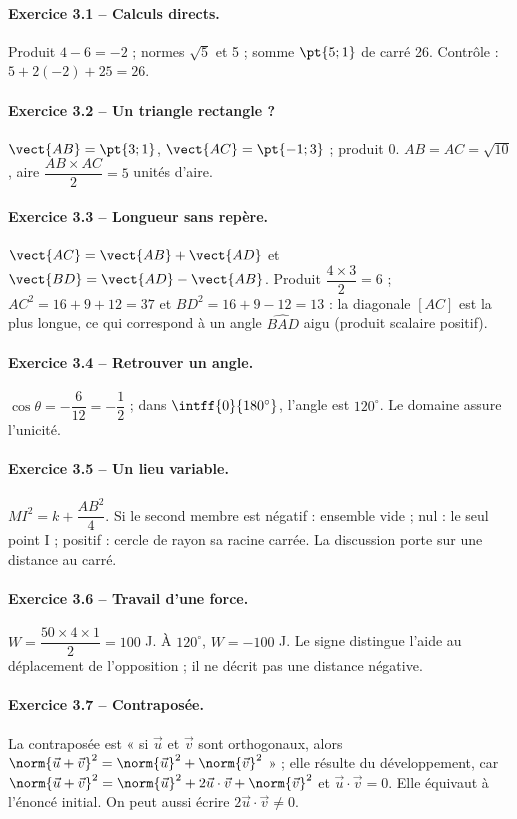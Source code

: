 \paragraph{Exercice 3.1 -- Calculs directs.} Produit $4-6=-2$ ; normes $\sqrt5$ et 5 ; somme $\pt{5;1}$ de carré 26. Contrôle : $5+2(-2)+25=26$.
\paragraph{Exercice 3.2 -- Un triangle rectangle ?} $\vect{AB}=\pt{3;1}$, $\vect{AC}=\pt{-1;3}$ ; produit 0. $AB=AC=\sqrt{10}$, aire $\dfrac{AB\times AC}{2}=5$ unités d’aire.
\paragraph{Exercice 3.3 -- Longueur sans repère.} $\vect{AC}=\vect{AB}+\vect{AD}$ et $\vect{BD}=\vect{AD}-\vect{AB}$. Produit $\dfrac{4\times 3}{2}=6$ ; $AC^2=16+9+12=37$ et $BD^2=16+9-12=13$ : la diagonale $[AC]$ est la plus longue, ce qui correspond à un angle $\widehat{BAD}$ aigu (produit scalaire positif).
\paragraph{Exercice 3.4 -- Retrouver un angle.} $\cos \theta =-\dfrac{6}{12}=-\dfrac{1}{2}$ ; dans $\intff{0}{180^\circ}$, l’angle est $120^\circ$. Le domaine assure l’unicité.
\paragraph{Exercice 3.5 -- Un lieu variable.} $MI^2=k+\dfrac{AB^2}{4}$. Si le second membre est négatif : ensemble vide ; nul : le seul point I ; positif : cercle de rayon sa racine carrée. La discussion porte sur une distance au carré.
\paragraph{Exercice 3.6 -- Travail d’une force.} $W=\dfrac{50\times 4\times 1}{2}=100$ J. À $120^\circ$, $W=-100$ J. Le signe distingue l’aide au déplacement de l’opposition ; il ne décrit pas une distance négative.
\paragraph{Exercice 3.7 -- Contraposée.} La contraposée est « si $\vec u$ et $\vec v$ sont orthogonaux, alors $\norm{\vec u+\vec v}^2=\norm{\vec u}^2+\norm{\vec v}^2$ » ; elle résulte du développement, car $\norm{\vec u+\vec v}^2=\norm{\vec u}^2+2\vec u\cdot\vec v+\norm{\vec v}^2$ et $\vec u\cdot\vec v=0$. Elle équivaut à l’énoncé initial. On peut aussi écrire $2\vec u\cdot\vec v\ne0$.
